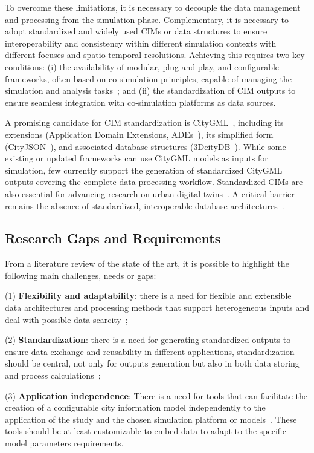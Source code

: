 To overcome these limitations, it is necessary to decouple the data management and processing from the simulation phase. Complementary, it is necessary to adopt standardized and widely used CIMs or data structures to ensure interoperability and consistency within different simulation contexts with different focuses and spatio-temporal resolutions. Achieving this requires two key conditions: (i) the availability of modular, plug-and-play, and configurable frameworks, often based on co-simulation principles, capable of managing the simulation and analysis tasks~\cite{mosaik, helics, coesi1, mosaikDH}; and (ii) the standardization of CIM outputs to ensure seamless integration with co-simulation platforms as data sources.

A promising candidate for CIM standardization is CityGML~\cite{ogc-citygml}, including its extensions (Application Domain Extensions, ADEs~\cite{cityADE}), its simplified form (CityJSON~\cite{cjspec}), and associated database structures (3DcityDB~\cite{yao20183dcitydb}). While some existing or updated frameworks can use CityGML models as inputs for simulation, few currently support the generation of standardized CityGML outputs covering the complete data processing workflow. Standardized CIMs are also essential for advancing research on urban digital twins~\cite{kutzner2020citygml}. A critical barrier remains the absence of standardized, interoperable database architectures~\cite{wate20153d}.

\subsection{Research Gaps and Requirements}

From a literature review of the state of the art, it is possible to highlight the following main challenges, needs or gaps: 

(1) \textbf{Flexibility and adaptability}: there is a need for flexible and extensible data architectures and processing methods that support heterogeneous inputs and deal with possible data scarcity~\cite{iseri2025method, perez2014framework}; 

(2) \textbf{Standardization}: there is a need for generating standardized outputs to ensure data exchange and reusability in different applications, standardization should be central, not only for outputs generation but also in both data storing and process calculations~\cite{agugiaro2018energy,luo2025data, rehmann2025enhancing}; 

(3) \textbf{Application independence}: There is a need for tools that can facilitate the creation of a configurable city information model independently to the application of the study and the chosen simulation platform or models~\cite{issermann2021interactive,charan2021integration}. These tools should be at least customizable to embed data to adapt to the specific model parameters requirements.

